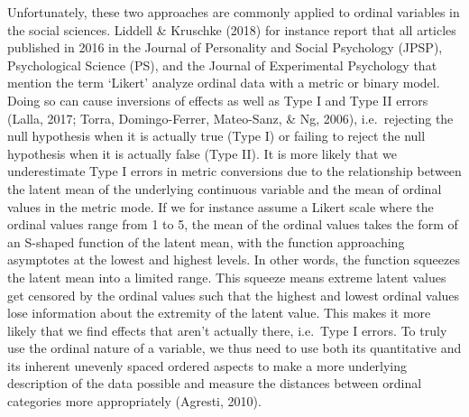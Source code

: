 \documentclass[12pt,econ]{sources/authesis}
\begin{document}
Unfortunately, these two approaches are commonly applied to ordinal variables in the social sciences. Liddell \& Kruschke (2018) for instance report that all articles published in 2016 in the Journal of Personality and Social Psychology (JPSP), Psychological Science (PS), and the Journal of Experimental Psychology that mention the term `Likert' analyze ordinal data with a metric or binary model. Doing so can cause inversions of effects as well as Type I and Type II errors (Lalla, 2017; Torra, Domingo-Ferrer, Mateo-Sanz, \& Ng, 2006), i.e.~rejecting the null hypothesis when it is actually true (Type I) or failing to reject the null hypothesis when it is actually false (Type II). It is more likely that we underestimate Type I errors in metric conversions due to the relationship between the latent mean of the underlying continuous variable and the mean of ordinal values in the metric mode. If we for instance assume a Likert scale where the ordinal values range from 1 to 5, the mean of the ordinal values takes the form of an S-shaped function of the latent mean, with the function approaching asymptotes at the lowest and highest levels. In other words, the function squeezes the latent mean into a limited range. This squeeze means extreme latent values get censored by the ordinal values such that the highest and lowest ordinal values lose information about the extremity of the latent value. This makes it more likely that we find effects that aren't actually there, i.e.~Type I errors. To truly use the ordinal nature of a variable, we thus need to use both its quantitative and its inherent unevenly spaced ordered aspects to make a more underlying description of the data possible and measure the distances between ordinal categories more appropriately (Agresti, 2010).
\end{document}
